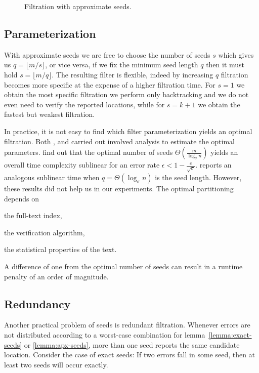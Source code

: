\begin{figure}[h]
\begin{center}
\caption[Filtration with approximate seeds]{Filtration with approximate seeds.}
\label{fig:seeds-apx}

\end{center}
\end{figure}


\subsection{Parameterization}

With approximate seeds we are free to choose the number of seeds $s$ which gives us $q =\lfloor m/s \rfloor$, or vice versa, if we fix the minimum seed length $q$ then it must hold $s = \lfloor m/q \rfloor$.
The resulting filter is flexible, indeed by increasing $q$ filtration becomes more specific at the expense of a higher filtration time.
For $s=1$ we obtain the most specific filtration \ie we perform only backtracking and we do not even need to verify the reported locations, while for $s=k+1$ we obtain the fastest but weakest filtration.

In practice, it is not easy to find which filter parameterization yields an optimal filtration.
Both \citeauthor{Myers1994}, and \citeauthor{Navarro2000} carried out involved analysis to estimate the optimal parameters. \citeauthor{Navarro2000} find out that the optimal number of seeds $\Theta(\frac{m}{\log_{\sigma}{n}})$ yields an overall time complexity sublinear for an error rate $\epsilon < 1 - \frac{e}{\sqrt{\sigma}}$.
\citeauthor{Myers1994} reports an analogous sublinear time when $q=\Theta(\log_{\sigma}{n})$ is the seed length.
However, these results did not help us in our experiments.
The optimal partitioning depends on
\begin{inparaenum}[(i)]
\item the full-text index,
\item the verification algorithm,
\item the statistical properties of the text.
\end{inparaenum}
A difference of one from the optimal number of seeds can result in a runtime penalty of an order of magnitude.

\subsection{Redundancy}

Another practical problem of seeds is redundant filtration.
Whenever errors are not distributed according to a worst-case combination for lemma~\ref{lemma:exact-seeds} or \ref{lemma:apx-seeds}, more than one seed reports the same candidate location.
Consider the case of exact seeds: If two errors fall in some seed, then at least two seeds will occur exactly.

